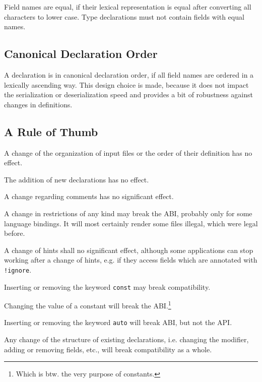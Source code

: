 \documentclass[a4paper,10pt]{article}
\begin{document}
Field names are equal, if their lexical representation is equal after converting all characters to lower case. Type declarations must not contain fields with equal names.

\subsection{Canonical Declaration Order}

A declaration is in canonical declaration order, if all field names are ordered in a lexically ascending way. This design choice is made, because it does not impact the serialization or deserialization speed and provides a bit of robustness against changes in definitions.


\subsection{A Rule of Thumb}

A change of the organization of input files or the order of their definition has no effect.

The addition of new declarations has no effect.

A change regarding comments has no significant effect.

A change in restrictions of any kind may break the ABI, probably only for some language bindings. It will most certainly render some files illegal, which were legal before.

A change of hints shall no significant effect, although some applications can stop working after a change of hints, e.g. if they access fields which are annotated with \verb/!ignore/.

Inserting or removing the keyword \texttt{const} may break compatibility.

Changing the value of a constant will break the ABI.\footnote{Which is btw. the very purpose of constants.}

Inserting or removing the keyword \texttt{auto} will break ABI, but not the API.

Any change of the structure of existing declarations, i.e. changing the modifier, adding or removing fields, etc., will break compatibility as a whole.
\end{document}
